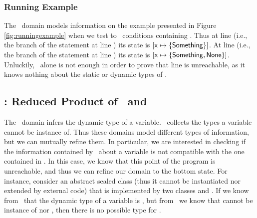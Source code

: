 \documentclass{llncs}
\begin{document}
\subsubsection{Running Example}
The \nottype\ domain models information on the example presented in Figure \ref{fig:runningexample} when we test to \false\ conditions containing . Thus at line  (i.e., the  branch of the  statement at line ) its state is $[\mathsf{x} \mapsto \{\mathsf{Something}\}]$. At line  (i.e., the  branch of the  statement at line ) its state is $[\mathsf{x} \mapsto \{\mathsf{Something}, \mathsf{None}\}]$. Unluckily, \nottype\ alone is not enough in order to prove that line  is unreachable, as it knows nothing about the static or dynamic types of .


\subsection{\notandtypesdomain: Reduced Product of \dynamictype\ and \nottype}

The \dynamictype\ domain infers the dynamic type of a variable. \nottype\ collects the types a variable cannot be instance of. Thus these domains model different types of information, but we can mutually refine them. In particular, we are interested in checking if the information contained by \nottype\ about a variable is not compatible with the one contained in \dynamictype. In this case, we know that this point of the program is unreachable, and thus we can refine our domain to the bottom state. For instance, consider an abstract sealed class  (thus it cannot be instantiated nor extended by external code) that is implemented by two classes  and . If we know from \dynamictype\ that the dynamic type of a variable  is , but from \nottype\ we know that  cannot be instance of  nor , then there is no possible type for .
\end{document}
